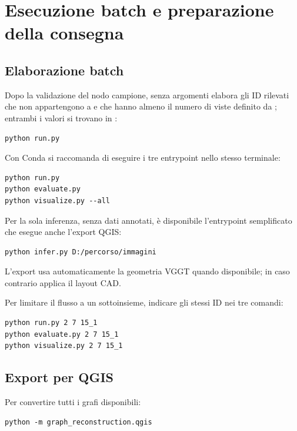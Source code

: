 \section{Esecuzione batch e preparazione della consegna}

\subsection{Elaborazione batch}

Dopo la validazione del nodo campione,  senza argomenti
elabora gli ID rilevati che non appartengono a  e che hanno
almeno il numero di viste definito da ; entrambi i valori si
trovano in :

\begin{lstlisting}[language={}]
python run.py
\end{lstlisting}

Con Conda si raccomanda di eseguire i tre entrypoint nello stesso terminale:

\begin{lstlisting}[language={}]
python run.py
python evaluate.py
python visualize.py --all
\end{lstlisting}

Per la sola inferenza, senza dati annotati, è disponibile l'entrypoint
semplificato che esegue anche l'export QGIS:

\begin{lstlisting}[language={}]
python infer.py D:/percorso/immagini
\end{lstlisting}

L'export usa automaticamente la geometria VGGT quando disponibile; in caso
contrario applica il layout CAD.

Per limitare il flusso a un sottoinsieme, indicare gli stessi ID nei tre
comandi:

\begin{lstlisting}[language={}]
python run.py 2 7 15_1
python evaluate.py 2 7 15_1
python visualize.py 2 7 15_1
\end{lstlisting}

\subsection{Export per QGIS}

Per convertire tutti i grafi disponibili:

\begin{lstlisting}[language={}]
python -m graph_reconstruction.qgis
\end{lstlisting}

